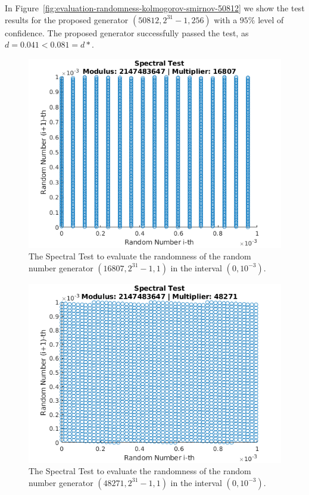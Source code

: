 \begin{itemize}
	In Figure~\ref{fig:evaluation-randomness-kolmogorov-smirnov-50812} we show the test results for the proposed generator $(50812,2^{31}-1, 256)$ with a $95\%$ level of confidence.
	The proposed generator successfully passed the test, as $d=0.041<0.081=d*$.
	
\end{itemize}

\begin{figure}
	\includegraphics[width=\columnwidth]{fig/evaluation-randomness-spectral-16807}
	\caption{The Spectral Test to evaluate the randomness of the random number generator $(16807,2^{31}-1, 1)$ in the interval $(0, 10^{-3})$.}
	\label{fig:evaluation-randomness-spectral-16807}
\end{figure}

\begin{figure}
	\includegraphics[width=\columnwidth]{fig/evaluation-randomness-spectral-48271}
	\caption{The Spectral Test to evaluate the randomness of the random number generator $(48271,2^{31}-1, 1)$ in the interval $(0, 10^{-3})$.}
	\label{fig:evaluation-randomness-spectral-48271}
\end{figure}

